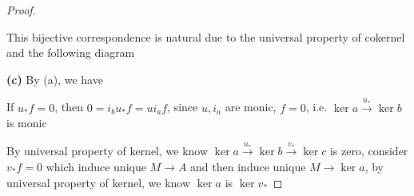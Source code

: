 \documentclass[../main.tex]{subfiles}
\begin{document}
\begin{proof}
\begin{center}
\begin{tikzcd}
\end{tikzcd}
\end{center}
This bijective correspondence is natural due to the universal property of cokernel and the following diagram
\begin{center}
\end{center}
\textbf{(c) }By (a), we have
\begin{center}
\end{center}
If $u_*f=0$, then $0=i_bu_*f=ui_af$, since $u,i_a$ are monic, $f=0$, i.e. $\ker a\xrightarrow{u_*}\ker b$ is monic \par
By universal property of kernel, we know $\ker a\xrightarrow{u_*}\ker b\xrightarrow{v_*}\ker c$ is zero, consider $v_*f=0$ which induce unique $M\to A$ and then induce unique $M\to\ker a$, by universal property of kernel, we know $\ker a$ is $\ker v_*$

\end{proof}
\end{document}
